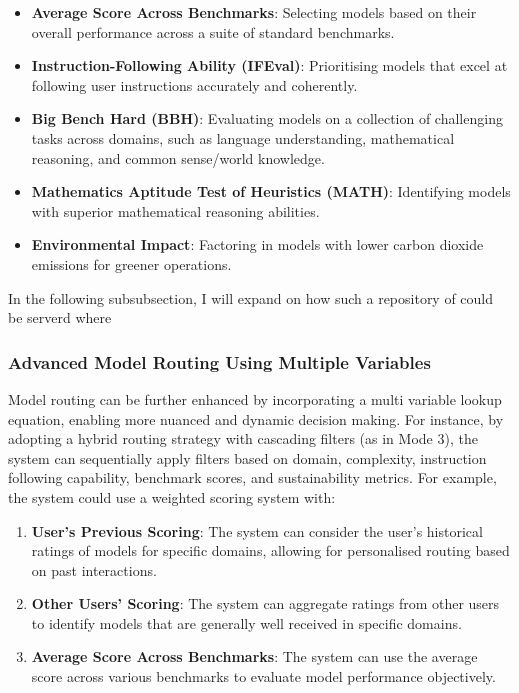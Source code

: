 \begin{itemize}
    \item \textbf{Average Score Across Benchmarks}: Selecting models based on their overall performance across a suite of standard benchmarks.
    \item \textbf{Instruction-Following Ability (IFEval)}: Prioritising models that excel at following user instructions accurately and coherently.
    \item \textbf{Big Bench Hard (BBH)}: Evaluating models on a collection of challenging tasks across domains, such as language understanding, mathematical reasoning, and common sense/world knowledge.
    \item \textbf{Mathematics Aptitude Test of Heuristics (MATH)}: Identifying models with superior mathematical reasoning abilities.
    \item \textbf{Environmental Impact}: Factoring in models with lower carbon dioxide emissions for greener operations.
\end{itemize}

In the following subsubsection, I will expand on how such a repository of could be serverd where 

\subsubsection{Advanced Model Routing Using Multiple Variables}

Model routing can be further enhanced by incorporating a multi variable lookup equation, enabling more nuanced and dynamic decision making. For instance, by adopting a hybrid routing strategy with cascading filters (as in Mode 3), the system can sequentially apply filters based on domain, complexity, instruction following capability, benchmark scores, and sustainability metrics. For example, the system could use a weighted scoring system with:

\begin{enumerate}
    \item \textbf{User's Previous Scoring}: The system can consider the user's historical ratings of models for specific domains, allowing for personalised routing based on past interactions.
    \item \textbf{Other Users' Scoring}: The system can aggregate ratings from other users to identify models that are generally well received in specific domains.
    \item \textbf{Average Score Across Benchmarks}: The system can use the average score across various benchmarks to evaluate model performance objectively.
\end{enumerate}

